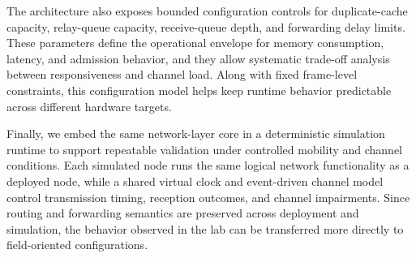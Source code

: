 The architecture also exposes bounded configuration controls for duplicate-cache capacity, relay-queue
capacity, receive-queue depth, and forwarding delay limits. These parameters define the operational envelope
for memory consumption, latency, and admission behavior, and they allow systematic trade-off analysis between
responsiveness and channel load. Along with fixed frame-level constraints, this configuration model helps keep
runtime behavior predictable across different hardware targets.

Finally, we embed the same network-layer core in a deterministic simulation runtime to support repeatable
validation under controlled mobility and channel conditions. Each simulated node runs the same logical network
functionality as a deployed node, while a shared virtual clock and event-driven channel model control
transmission timing, reception outcomes, and channel impairments. Since routing and forwarding semantics are
preserved across deployment and simulation, the behavior observed in the lab can be transferred more directly
to field-oriented configurations.

